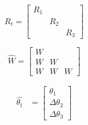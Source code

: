 \documentclass{article}
\begin{document}
\[
  R_t =
  \begin{bmatrix}
    R_{1} & & \\
    & R_{2} & \\
    & & R_{3}
  \end{bmatrix}
\]

\[
  \hat{W} =
  \begin{bmatrix}
    W & & \\
    W & W & \\
    W & W & W
  \end{bmatrix}
\]


\begin{align}
  \label{eq:3}
  \hat{\theta_t} &=
              \begin{bmatrix}
                \theta_1\\
                \Delta \theta_2\\
                \Delta \theta_3
              \end{bmatrix}
\end{align}
\end{document}

